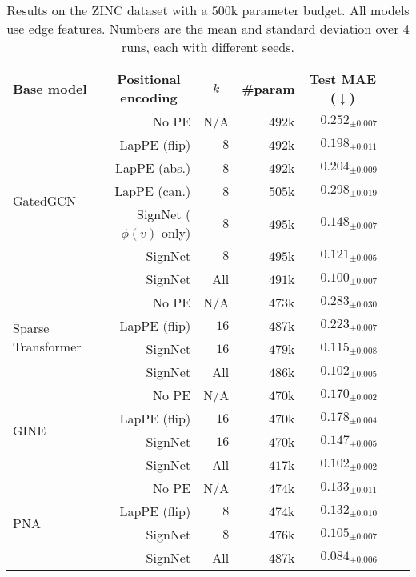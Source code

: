 \documentclass{article} \usepackage{iclr2023_conference,times}
\begin{document}
\begin{table}[ht]
    \centering
    \caption{Results on the ZINC dataset with a $500$k parameter budget. All models use edge features. Numbers are the mean and standard deviation over 4 runs, each with different seeds.}
    \label{tab:zinc}
    {\small
    \begin{tabular}{lrrrrrr}
        \toprule
        Base model
        & \multicolumn{1}{c}{Positional encoding}  & \multicolumn{1}{c}{$k$} & \multicolumn{1}{c}{\#param} 
        & \multicolumn{1}{c}{Test MAE ($\downarrow$)}\\
        \midrule
   \multirow{7}{*}{GatedGCN} & No PE  & N/A & $492$k & $0.252_{\pm 0.007}$ \\
         & LapPE (flip)  & $8$ & $492$k & $0.198_{\pm 0.011}$ \\
         & LapPE (abs.)  & 8 & $492$k & $0.204_{\pm 0.009}$ \\
         & LapPE (can.)  & 8 & $505$k & $0.298_{\pm 0.019}$ \\
         & SignNet ($\phi(v)$ only) & $8$ & $495$k &
 $0.148_{\pm 0.007}$ \\
         & SignNet & $8$ & $495$k &
 $0.121_{\pm 0.005}$ \\
    & SignNet & All & $491$k &
     $\mathbf{0.100_{\pm 0.007}}$ \\
        \midrule
        \multirow{4}{*}{Sparse  Transformer} & No PE  & N/A & $473$k & $0.283_{\pm 0.030}$ \\
         & LapPE (flip)  & $16$ & $487$k & $0.223_{\pm 0.007}$ \\
         & SignNet  & $16$ & $479$k & $0.115_{\pm 0.008}$ \\
         & SignNet  & All & $486$k & $\mathbf{0.102_{\pm 0.005}}$ \\
        \midrule
        \multirow{4}{*}{GINE} & No PE  & N/A & $470$k & $0.170_{\pm 0.002}$ \\
         & LapPE (flip)  & $16$ & $470$k & $0.178_{\pm 0.004}$ \\
         & SignNet  & $16$ & $470$k & $0.147_{\pm 0.005}$ \\
         & SignNet & All & $417$k & $\mathbf{0.102_{\pm 0.002}}$ \\
         \midrule
         \multirow{4}{*}{PNA} & No PE  & N/A & $474$k  & $0.133_{\pm 0.011}$ \\
         & LapPE (flip)  & $8$ & $474$k & $0.132_{\pm 0.010}$ \\
         & SignNet  & $8$ & $476$k  & $0.105_{\pm 0.007}$ \\
         & SignNet  & All & $487$k  & $\mathbf{0.084_{\pm 0.006}}$ \\
        
        \bottomrule
    \end{tabular}
}
    \vspace{-5pt}
\end{table}
\end{document}
